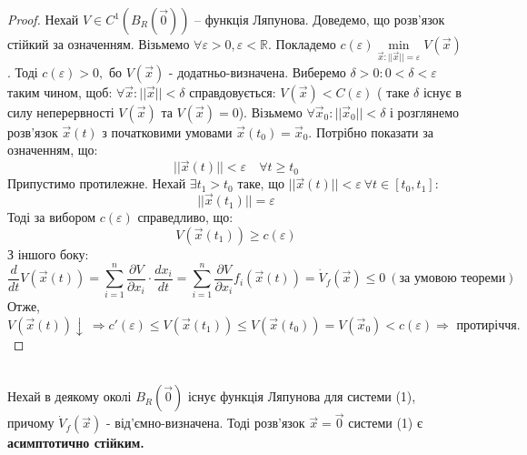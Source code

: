 \documentclass[14pt,a4paper]{scrartcl}
\theoremstyle{definition}
\theoremstyle{definition}
\theoremstyle{definition}
\begin{document}
\begin{proof}
   Нехай $ V \in C^{1} ( B_{R} ( \overrightarrow{0} ))$ -- функція Ляпунова. Доведемо, що розв'язок стійкий за означенням. Візьмемо $ \forall \varepsilon > 0, \varepsilon < \mathbb{R}$. Покладемо $ c( \varepsilon) \min\limits_{\overrightarrow{x} : ||\overrightarrow{x}|| = \varepsilon} V(\overrightarrow{x}) $. Тоді $ c(\varepsilon) > 0, $ бо $ V( \overrightarrow{x}) $ - додатньо-визначена. Виберемо $ \delta > 0 : 0 < \delta < \varepsilon $ таким чином, щоб: $ \forall \overrightarrow{x}: ||\overrightarrow{x}|| < \delta $ справдовується: $V (\overrightarrow{x}) < C(\varepsilon) $ ( таке $\delta$ існує в силу неперервності $V( \overrightarrow{x})$ та $V ( \overrightarrow{x}) =0 $). Візьмемо $\forall \overrightarrow{x}_0: ||\overrightarrow{x}_0||< \delta $ і розглянемо розв'язок $\overrightarrow{x} (t) $ з початковими умовами $ \overrightarrow{x}(t_0) = \overrightarrow{x}_0$. Потрібно показати за означенням, що:
   $$
   ||\overrightarrow{x}(t)|| < \varepsilon \quad \forall t \geq t_0
   $$
  Припустимо протилежне. Нехай $ \exists t_1 > t_0 $ таке, що $|| \overrightarrow{x}(t) ||< \varepsilon \ \forall t \in [ t_0 , t_1 ]:  $ $$ || \overrightarrow{ x} (t_1) || = \varepsilon$$
  Тоді за вибором $ c ( \varepsilon)$ справедливо, що:
  $$ V(\overrightarrow{x}(t_1)) \geq c(\varepsilon)$$
  З іншого боку:
  $$
  \frac{d}{dt} V(\overrightarrow{x} (t)) =  \sum\limits_{i = 1}^{ n}{ \frac{\partial V}{ \partial x_i } } \cdot \frac{dx_i}{dt} =  \sum\limits_{i = 1}^{n}{ \frac{\partial V}{ \partial x_i } f_i ( \overrightarrow{x} (t))} = \dot{V}_f (\overrightarrow{x}) \leq 0 \  (\text{за умовою теореми})
  $$
  Отже, $V (\overrightarrow{x}(t))\!\! \downarrow \  \!\Rightarrow\!
  c'(\varepsilon) \!\leq\!  V(\overrightarrow{x} (t_1)) \!\leq\! V(\overrightarrow{x} (t_0)) \!=\! V(\overrightarrow{x}_0) \!<\! c(\varepsilon ) \!\Rightarrow\! \text{ протиріччя.}$
\end{proof}
\begin{boxteo}\ \\ Нехай в деякому околі $B_R(\overrightarrow{0})$ існує функція Ляпунова для системи (1), причому $\dot{V}_f (\overrightarrow{x})$ - від'ємно-визначена.
Тоді розв'язок $\overrightarrow{x} = \overrightarrow{0}$ системи (1) є \textbf{асимптотично стійким.}
\end{boxteo}
\end{document}
